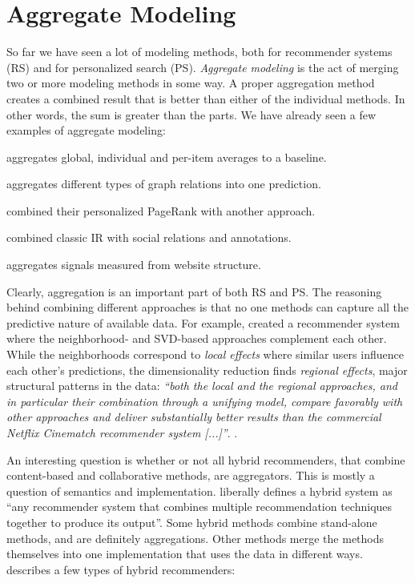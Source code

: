 \section{Aggregate Modeling}
\label{sec:aggregate}

So far we have seen a lot of modeling methods, both for recommender systems (RS) and for personalized search (PS).
\emph{Aggregate modeling} is the act of merging two or more modeling methods in some way.
A proper aggregation method creates a combined result that is better than either of the individual methods.
In other words, the sum is greater than the parts.
We have already seen a few examples of aggregate modeling:

\begin{itemize*}
  \item \cite{Koren2008} aggregates global, individual and per-item averages to a baseline.
  \item \cite{Huang2002} aggregates different types of graph relations into one prediction.
  \item \citet{Haveliwala2003} combined their personalized PageRank with another approach.
  \item \cite{Carmel2009} combined classic IR with social relations and annotations.
  \item \citet[p5]{Bender2005} aggregates signals measured from website structure.
\end{itemize*}

Clearly, aggregation is an important part of both RS and PS.
The reasoning behind combining different approaches is that no one methods
can capture all the predictive nature of available data.
For example, 
\cite{Bell2007b} created a recommender system where the neighborhood- and SVD-based approaches complement each other.
While the neighborhoods correspond to \emph{local effects} where similar users influence each other's predictions,
the dimensionality reduction finds \emph{regional effects}, major structural patterns in the data:
\emph{``both the local and the regional approaches, and in particular their combination through a unifying model, 
compare favorably with other approaches and deliver substantially better results than the 
commercial Netflix Cinematch recommender system [...]''}.
\cite{Bell2007b}.

An interesting question is whether or not all hybrid recommenders,
that combine content-based and collaborative methods, are aggregators. 
This is mostly a question of semantics and implementation.
\citet[p4]{Burke2007} liberally defines a hybrid system as 
``any recommender system that combines multiple recommendation techniques together to produce its output''.
Some hybrid methods combine stand-alone methods, and are definitely aggregations.
Other methods merge the methods themselves into one implementation that uses the data in different ways.
\citeauthor{Burke2007} describes a few types of hybrid recommenders:


